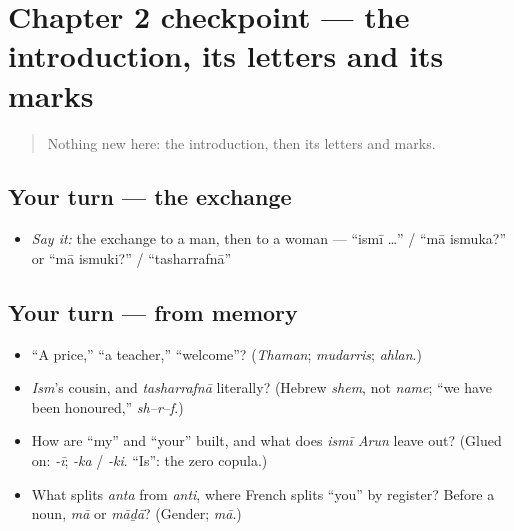 \section[Practice]{Chapter 2 checkpoint — the introduction, its letters and its marks}

\label{lesson:AR-C02-checkpoint}



\begin{quote}
Nothing new here: the introduction, then its letters and marks.
\end{quote}

\subsection*{Your turn — the exchange}
\begin{itemize}
\raggedright
  \item \emph{Say it:} the exchange to a man, then to a woman — \textquotedblleft{}ismī …\textquotedblright{} / \textquotedblleft{}mā ismuka?\textquotedblright{} or \textquotedblleft{}mā ismuki?\textquotedblright{} / \textquotedblleft{}tasharrafnā\textquotedblright{}
\end{itemize}

\subsection*{Your turn — from memory}
\begin{itemize}
\raggedright
  \item \textquotedblleft{}A price,\textquotedblright{} \textquotedblleft{}a teacher,\textquotedblright{} \textquotedblleft{}welcome\textquotedblright{}? (\emph{Thaman}; \emph{mudarris}; \emph{ahlan}.)
  \item \emph{Ism}'s cousin, and \emph{tasharrafnā} literally? (Hebrew \emph{shem}, not \emph{name}; \textquotedblleft{}we have been honoured,\textquotedblright{} \emph{sh–r–f}.)
  \item How are \textquotedblleft{}my\textquotedblright{} and \textquotedblleft{}your\textquotedblright{} built, and what does \emph{ismī Arun} leave out? (Glued on: \emph{-ī}; \emph{-ka} / \emph{-ki}. \textquotedblleft{}Is\textquotedblright{}: the zero copula.)
  \item What splits \emph{anta} from \emph{anti}, where French splits \textquotedblleft{}you\textquotedblright{} by register? Before a noun, \emph{mā} or \emph{māḏā}? (Gender; \emph{mā}.)
\end{itemize}

